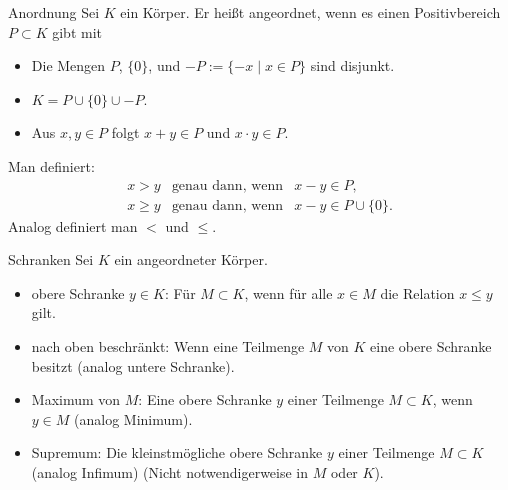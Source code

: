 \documentclass[notes=hide,hyperref={dvipdfmx,pdfpagelabels=false}]{beamer}
\begin{document}
\begin{frame}[fragile]{Anordnung}
Sei $K$ ein Körper. Er heißt {\color{red} angeordnet}, wenn es einen {\color{red}
Positivbereich} $P \subset K$ gibt mit
\begin{itemize}
\item Die Mengen $P$, $\{ 0 \}$, und $-P:=\{-x\;|\;x \in P \}$ sind
disjunkt. 
\item $K = P \cup \{ 0 \} \cup -P$.
\item Aus $x,y \in P$ folgt $x+y \in P$ und $x \cdot y \in P$. 
\end{itemize}
Man definiert:
\begin{eqnarray*}
 x >y& \text{genau dann, wenn}& x-y\in P,\\
 x \geq y&  \text{genau dann, wenn} &x-y \in P \cup \{ 0 \}.
\end{eqnarray*}
Analog definiert man $<$ und $\leq$. 
\end{frame}

\begin{frame}{Schranken}
Sei $K$ ein angeordneter Körper.
\begin{itemize}
\item {\color{red} obere Schranke} $y\in K$: Für $M \subset K$, wenn für alle $x\in M$ die Relation $x \leq y$ gilt.
\item nach oben {\color{red} beschränkt}: Wenn eine Teilmenge $M$ von $K$ eine obere Schranke besitzt (analog {\color{red} untere Schranke}).
\item {\color{red} Maximum} von $M$: Eine obere Schranke $y$ einer Teilmenge $M \subset K$, wenn $y\in M$ (analog {\color{red} Minimum}).
\item {\color{red} Supremum}: Die kleinstmögliche obere Schranke $y$ einer Teilmenge $M \subset K$ (analog {\color{red} Infimum}) 
(Nicht notwendigerweise in $M$ oder $K$).  
\end{itemize}
\end{frame} 
\end{document}

